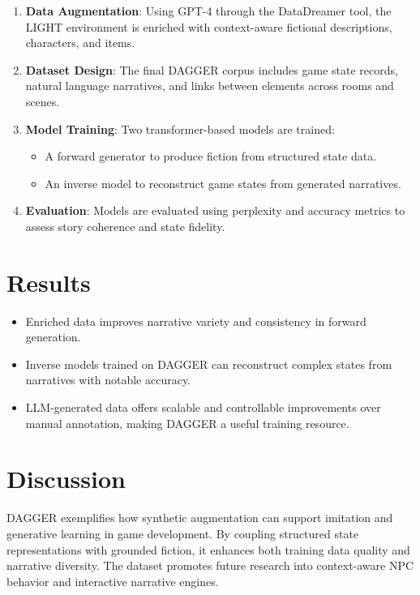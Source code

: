 \documentclass[12pt,a4paper]{article}
\begin{document}
\begin{enumerate}
  \item \textbf{Data Augmentation}: Using GPT-4 through the DataDreamer tool, the LIGHT environment is enriched with context-aware fictional descriptions, characters, and items.
  \item \textbf{Dataset Design}: The final DAGGER corpus includes game state records, natural language narratives, and links between elements across rooms and scenes.
  \item \textbf{Model Training}: Two transformer-based models are trained:
    \begin{itemize}
      \item A forward generator to produce fiction from structured state data.
      \item An inverse model to reconstruct game states from generated narratives.
    \end{itemize}
  \item \textbf{Evaluation}: Models are evaluated using perplexity and accuracy metrics to assess story coherence and state fidelity.
\end{enumerate}

\section*{Results}

\begin{itemize}
  \item Enriched data improves narrative variety and consistency in forward generation.
  \item Inverse models trained on DAGGER can reconstruct complex states from narratives with notable accuracy.
  \item LLM-generated data offers scalable and controllable improvements over manual annotation, making DAGGER a useful training resource.
\end{itemize}

\section*{Discussion}

DAGGER exemplifies how synthetic augmentation can support imitation and generative learning in game development. By coupling structured state representations with grounded fiction, it enhances both training data quality and narrative diversity. The dataset promotes future research into context-aware NPC behavior and interactive narrative engines.
\end{document}
